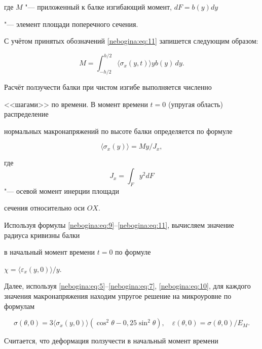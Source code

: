 где $M$ "--- приложенный к балке изгибающий момент, $dF=b(y)dy$

"--- элемент площади поперечного сечения. 

С учётом принятых обозначений \eqref{nebogina:eq:11} запишется следующим образом:

$$

M= \int _{-h/2}^{h/2} \langle\sigma_x (y,t)\rangle y b(y) \, dy.

$$



Расчёт ползучести балки при чистом изгибе выполняется численно

<<шагами>> по времени. В момент времени $t=0$ (упругая область) распределение

нормальных макронапряжений по высоте балки определяется по формуле

\begin{equation}

\label{nebogina:eq:12}

 \langle\sigma_x(y)\rangle= {M} y / {J_x} ,

\end{equation}

где $$J_x=\int _F y^2 dF$$ "--- осевой момент инерции площади

сечения относительно оси $OX$.



Используя формулы \eqref{nebogina:eq:9}--\eqref{nebogina:eq:11}, вычисляем значение радиуса кривизны балки

в начальный момент времени $t=0$ по формуле

$\chi=\langle\varepsilon_x(y,0)\rangle/y$.



Далее, используя \eqref{nebogina:eq:5}--\eqref{nebogina:eq:7}, \eqref{nebogina:eq:10}, для каждого значения макронапряжения находим упругое решение на микроуровне по формулам

\begin{equation}\label{nebogina:eq:13}

\sigma(\theta,0)= 3\langle\sigma_x(y,0)\rangle\left( \cos^2 \theta-

0,25 \sin^2\theta \right), \quad \varepsilon(\theta,0)=

{\sigma(\theta,0)}/{E_M}.

\end{equation}

Считается, что деформация ползучести в начальный момент времени

